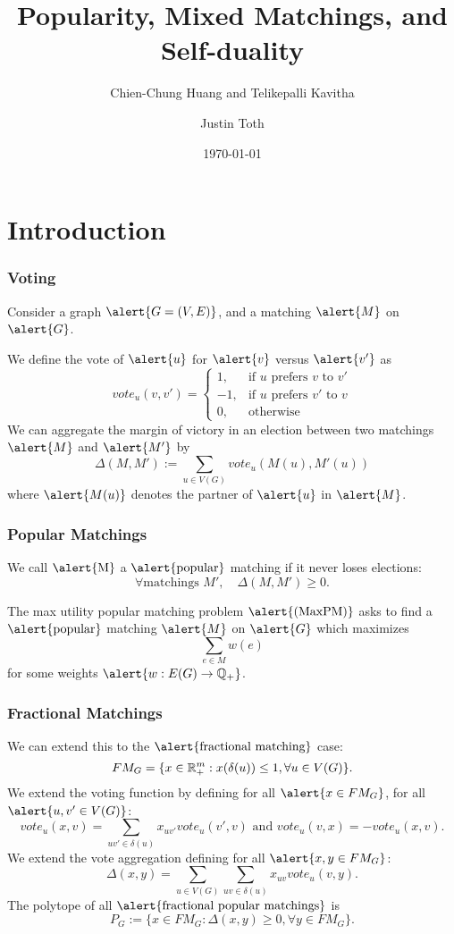 \documentclass[10pt]{beamer}
\title{Popularity, Mixed Matchings, and Self-duality}
\subtitle{Chien-Chung Huang and Telikepalli Kavitha}
\date{\today}
\author{Justin Toth}
\institute{University of Waterloo}
\newcommand{\Q}{\mathbb{Q}}
\begin{document}
\maketitle

\section{Introduction}

\begin{frame}
\frametitle{Voting}
Consider a graph $\alert{G = (V,E)}$, and a matching $\alert{M}$ on $\alert{G}$.

We define the vote of $\alert{u}$ for $\alert{v}$ versus $\alert{v'}$ as
$$vote_u(v,v') = \begin{cases}
1, &\text{if $u$ prefers $v$ to $v'$} \\
-1, &\text{if $u$ prefers $v'$ to $v$} \\
0, &\text{otherwise}
\end{cases}
$$
We can aggregate the margin of victory in an election between two matchings $\alert{M}$ and $\alert{M'}$ by
$$\Delta(M,M') := \sum_{u \in V(G)} vote_u(M(u), M'(u)) $$
where $\alert{M(u)}$ denotes the partner of $\alert{u}$ in $\alert{M}$.
\end{frame}

\begin{frame}
\frametitle{Popular Matchings}
We call $\text{\alert{M}}$ a $\text{\alert{popular}}$ matching if it never loses elections:
$$\forall \text{matchings } M', \quad \Delta(M,M') \geq 0.$$


The max utility popular matching problem $\text{\alert{(MaxPM)}}$ asks to find a $\text{\alert{popular}}$ matching $\alert{M}$ on $\alert{G}$ which maximizes
$$\sum_{e\in M} w(e)$$
for some weights $\alert{ w: E(G) \rightarrow \Q_+}$.
\end{frame}

\begin{frame}
\frametitle{Fractional Matchings}
We can extend this to the $\text{\alert{fractional matching}}$ case:
$$FM_{G} = \{x \in \mathbb{R}^m_+ : x(\delta(u)) \leq 1, \forall u \in V(G)\}.$$
We extend the voting function by defining for all $\alert{x \in FM_G}$, for all $\alert{u,v' \in V(G)}$:
$$vote_u(x,v) = \sum_{uv'\in \delta(u)} x_{uv'} vote_u(v',v) \text{ and } vote_u(v,x) = -vote_u(x,v).$$ 
We extend the vote aggregation defining for all $\alert{x, y \in FM_{G}}$:
$$\Delta(x,y) = \sum_{u \in V(G)} \sum_{uv \in \delta(u)} x_{uv}vote_u(v,y).$$
The polytope of all $\text{\alert{fractional popular matchings}}$ is 
$$P_G := \{x \in FM_{G}: \Delta(x,y) \geq 0, \forall y \in FM_G\}.$$
\end{frame}
\end{document}
